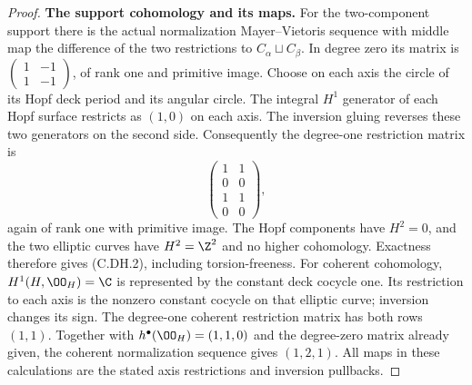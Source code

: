 \begin{proof}
\par\medskip\noindent\textbf{The support cohomology and its maps.}
For the two-component
support there is the
actual normalization
Mayer--Vietoris sequence
with middle map the
difference of the two
restrictions to
$C_\alpha\sqcup C_\beta$.
In degree zero its
matrix is
$\left(\begin{smallmatrix}1&-1\\1&-1\end{smallmatrix}\right)$,
of rank one and
primitive image.
Choose on each axis
the circle of its
Hopf deck period and
its angular circle.
The integral $H^1$
generator of each
Hopf surface restricts
as $(1,0)$ on each
axis. The inversion
gluing reverses these
two generators on
the second side.
Consequently the
degree-one restriction
matrix is
\[
                     \begin{pmatrix}
                       1&1\\0&0\\1&1\\0&0
                     \end{pmatrix},                \tag{C.DH.16}
\]
again of rank one
with primitive image.
The Hopf components
have $H^2=0$, and
the two elliptic
curves have $H^2=\Z^2$
and no higher
cohomology. Exactness
therefore gives
(C.DH.2), including
torsion-freeness.
For coherent cohomology,
$H^1(H,\OO_H)=\C$
is represented by
the constant deck
cocycle one. Its
restriction to each
axis is the nonzero
constant cocycle on
that elliptic curve;
inversion changes
its sign. The
degree-one coherent
restriction matrix
has both rows $(1,1)$.
Together with
$h^\bullet(\OO_H)=(1,1,0)$
and the degree-zero
matrix already given,
the coherent
normalization sequence
gives $(1,2,1)$.
All maps in these
calculations are
the stated axis
restrictions and
inversion pullbacks.
\end{proof}
